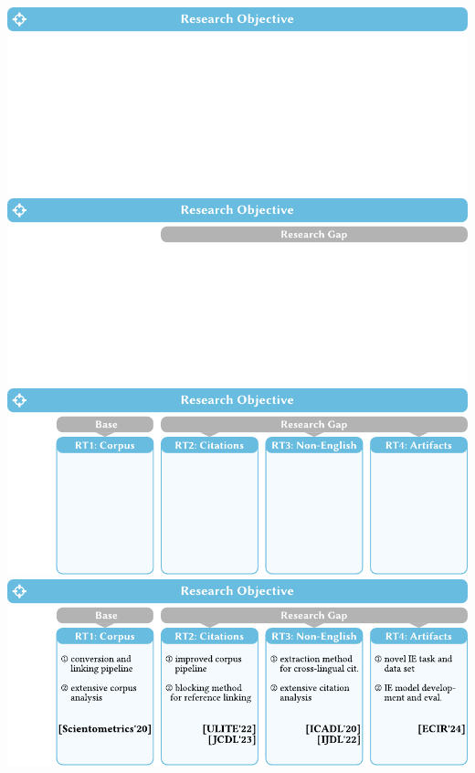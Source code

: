 \documentclass[en,16:9,smallfoot]{sdqbeamer}
\begin{document}


   \begin{frame}[plain]
       \begin{overprint}
            \centering\includegraphics[width=\textwidth]{imgs/objective_grid_and_contrib_0}
            \centering\includegraphics[width=\textwidth]{imgs/objective_grid_and_contrib_conclusion_rts_0}
            \centering\includegraphics[width=\textwidth]{imgs/objective_grid_and_contrib_conclusion_rts_1}
            \centering\includegraphics[width=\textwidth]{imgs/objective_grid_and_contrib_conclusion_rts_2}

\end{overprint}
\end{frame}
\end{document}
